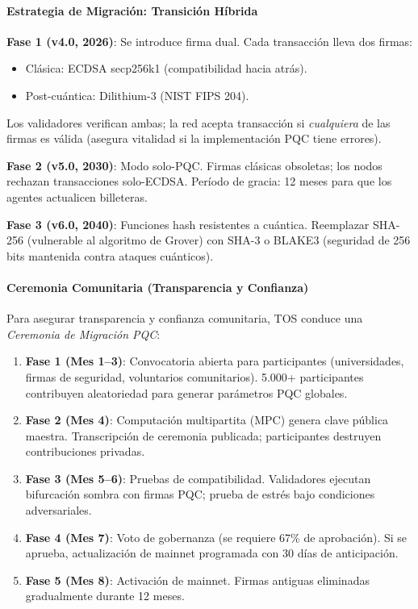 \documentclass[11pt]{article}
\begin{document}
\paragraph{Estrategia de Migración: Transición Híbrida}
\textbf{Fase 1 (v4.0, 2026)}: Se introduce firma dual. Cada transacción lleva dos firmas:
\begin{itemize}[noitemsep]
  \item Clásica: ECDSA secp256k1 (compatibilidad hacia atrás).
  \item Post-cuántica: Dilithium-3 (NIST FIPS 204).
\end{itemize}
Los validadores verifican ambas; la red acepta transacción si \emph{cualquiera} de las firmas es válida (asegura vitalidad si la implementación PQC tiene errores).

\textbf{Fase 2 (v5.0, 2030)}: Modo solo-PQC. Firmas clásicas obsoletas; los nodos rechazan transacciones solo-ECDSA. Período de gracia: 12 meses para que los agentes actualicen billeteras.

\textbf{Fase 3 (v6.0, 2040)}: Funciones hash resistentes a cuántica. Reemplazar SHA-256 (vulnerable al algoritmo de Grover) con SHA-3 o BLAKE3 (seguridad de 256 bits mantenida contra ataques cuánticos).

\paragraph{Ceremonia Comunitaria (Transparencia y Confianza)}
Para asegurar transparencia y confianza comunitaria, TOS conduce una \emph{Ceremonia de Migración PQC}:
\begin{enumerate}[noitemsep]
  \item \textbf{Fase 1 (Mes 1--3)}: Convocatoria abierta para participantes (universidades, firmas de seguridad, voluntarios comunitarios). 5.000+ participantes contribuyen aleatoriedad para generar parámetros PQC globales.
  \item \textbf{Fase 2 (Mes 4)}: Computación multipartita (MPC) genera clave pública maestra. Transcripción de ceremonia publicada; participantes destruyen contribuciones privadas.
  \item \textbf{Fase 3 (Mes 5--6)}: Pruebas de compatibilidad. Validadores ejecutan bifurcación sombra con firmas PQC; prueba de estrés bajo condiciones adversariales.
  \item \textbf{Fase 4 (Mes 7)}: Voto de gobernanza (se requiere 67\% de aprobación). Si se aprueba, actualización de mainnet programada con 30 días de anticipación.
  \item \textbf{Fase 5 (Mes 8)}: Activación de mainnet. Firmas antiguas eliminadas gradualmente durante 12 meses.
\end{enumerate}
\end{document}

